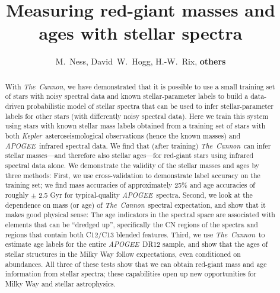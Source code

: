 \documentclass[12pt, preprint]{aastex}
\newcommand{\project}[1]{\textsl{#1}}
\newcommand{\thecannon}{\project{The~Cannon}}
\newcommand{\apogee}{\project{APOGEE}}
\newcommand{\kepler}{\project{Kepler}}
\begin{document}
\title{Measuring red-giant masses and ages with stellar spectra}
\author{M.~Ness,
David~W.~Hogg,
H.-W.~Rix,
\textbf{others}}

\begin{abstract}%
With \thecannon, we have demonstrated that it is possible to use a
small training set of stars with noisy spectral data and known
stellar-parameter labels to build a data-driven probabilistic model of
stellar spectra that can be used to infer stellar-parameter labels for
other stars (with differently noisy spectral data).
Here we train this system using stars with known stellar mass labels
obtained from a training set of stars with both
\kepler\ asteroseismological observations (hence the known masses) and
\apogee\ infrared spectral data.
We find that (after training) \thecannon\ can infer stellar
masses---and therefore also stellar ages---for red-giant stars using
infrared spectral data alone.
We demonstrate the validity of the stellar masses and ages by three
methods:
First, we use cross-validation to demonstrate label accuracy on the
training set; we find mass accuracies of approximately 25\% and age accuracies
of roughly $\pm$ 2.5 Gyr for typical-quality \apogee\ spectra.
Second, we look at the dependence on mass (or age) of
\thecannon\ spectral expectation, and show that it makes good physical
sense:
The age indicators in the spectral space are associated with elements
that can be ``dredged up'', specifically the CN regions of the spectra and regions that contain both C12/C13 blended features. 
Third, we use \thecannon\ to estimate age labels for the entire
\apogee\ DR12 sample, and show that the ages of stellar structures in the
Milky Way follow expectations, even conditioned on abundances.
All three of these tests show that we can obtain red-giant mass and
age information from stellar spectra; these capabilities open up new
opportunities for Milky Way and stellar astrophysics.
\end{abstract}
\end{document}
